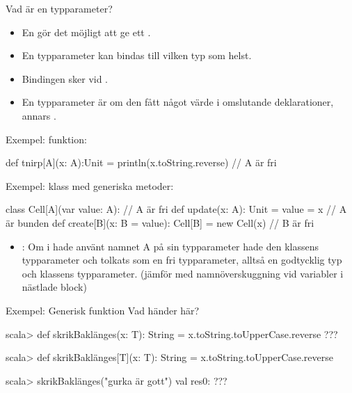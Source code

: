 \begin{Slide}{Vad är en typparameter?}\SlideFontSmall
  \setlength{\leftmargini}{0pt}

\begin{itemize}
\item En  gör det möjligt att ge ett .
\item En  typparameter kan bindas till vilken typ som helst.
\item Bindingen sker vid .
\item En typparameter är  om den  fått något värde i omslutande deklarationer, annars .
\end{itemize}
Exempel:  funktion:
\begin{Code}
def tnirp[A](x: A):Unit = println(x.toString.reverse) // A är fri
\end{Code}
\pause
Exempel:  klass med generiska metoder:
\begin{Code}
class Cell[A](var value: A):                          // A är fri
  def update(x: A): Unit = value = x                  // A är bunden
  def create[B](x: B = value): Cell[B] = new Cell(x)  // B är fri
\end{Code}
\pause
\begin{itemize}
\item {}: Om  i  hade använt namnet A på sin typparameter hade den  klassens typparameter och tolkats som en  fri typparameter, alltså en godtycklig typ och  klassens typparameter. (jämför med namnöverskuggning vid  variabler i nästlade block)
\end{itemize}

\end{Slide}

\ifkompendium\else
\begin{Slide}{Exempel: Generisk funktion}
Vad händer här?
\begin{REPL}

scala> def skrikBaklänges(x: T): String = x.toString.toUpperCase.reverse
???



scala> def skrikBaklänges[T](x: T): String = x.toString.toUpperCase.reverse

scala> skrikBaklänges("gurka är gott")
val res0: ???

\end{REPL}
\end{Slide}


